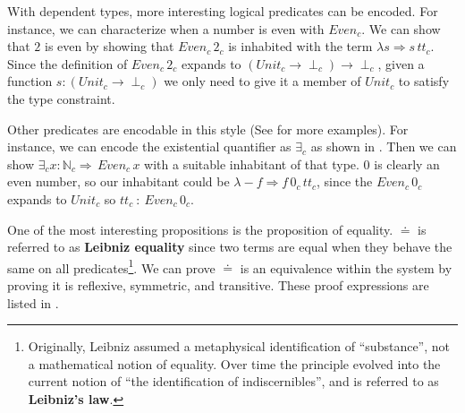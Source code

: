 With dependent types, more interesting logical predicates can be encoded.
For instance, we can characterize when a number is even with $Even_{c}$.
We can show that $2$ is even by showing that $Even_{c}\,2_{c}$ is inhabited with the term $\lambda s\Rightarrow s\,tt_{c}$.
Since the definition of $Even_{c}\,2_{c}$ expands to $(Unit_{c} \rightarrow \perp_{c}) \rightarrow \perp_{c}$, given a function $s : (Unit_{c} \rightarrow \perp_{c})$ we only need to give it a member of $Unit_{c}$ to satisfy the type constraint.

Other predicates are encodable in this style (See \cite{Martin-Lof-1971,cardelli1986polymorphic,10.1016/0890-5401(88)90005-3} for more examples).
For instance, we can encode the existential quantifier as $\exists_{c}$ as shown in .
Then we can show $\exists_{c}x:\mathbb{N}_{c}\Rightarrow\,Even_{c}\,x$ with a suitable inhabitant of that type.
$0$ is clearly an even number, so our inhabitant could be $\lambda-f\Rightarrow f\,0_{c}\,tt_{c}$, since the $Even_{c}\,0_{c}$ expands to $Unit_{c}$ so $tt_{c}\ :\ Even_{c}\,0_{c}$.

One of the most interesting propositions is the proposition of equality.
$\doteq$ is referred to as \textbf{Leibniz equality} since two terms are equal when they behave the same on all predicates\footnote{
  Originally, Leibniz assumed a metaphysical identification of ``substance'', not a mathematical notion of equality\cite[Section 9]{Leibniz1686}.
  Over time the principle evolved into the current notion of ``the identification of indiscernibles'', and is referred to as \textbf{Leibniz's law}.
}. 
We can prove $\doteq$ is an equivalence within the system by proving it is reflexive, symmetric, and transitive.
These proof expressions are listed in .

